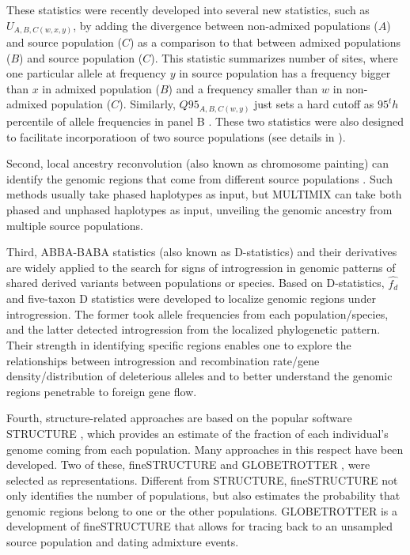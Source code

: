 \documentclass[11pt]{article}
\begin{document}
\begin{enumerate}
These statistics were recently developed into several new statistics, such as $U_{A,B,C(w,x,y)}$, by adding the divergence between non-admixed populations ($A$) and source population ($C$) as a comparison to that between admixed populations ($B$) and source population ($C$)\cite{racimo2016}. 
This statistic summarizes number of sites, where one particular allele at frequency $y$ in source population has a frequency bigger than $x$ in admixed population ($B$) and a frequency smaller than $w$ in non-admixed population ($C$).
Similarly, $Q95_{A,B,C(w,y)}$ just sets a hard cutoff as $95^th$ percentile of allele frequencies in panel B \cite{racimo2016}. 
These two statistics were also designed to facilitate incorporatioon of two source populations (see details in \cite{racimo2016}).
 
 
Second, local ancestry reconvolution (also known as chromosome painting) can identify the genomic regions that come from different source populations \cite{schraiber2015}. 
Such methods usually take phased haplotypes as input, but MULTIMIX \cite{churchhouse2013} can take both phased and unphased haplotypes as input, unveiling the genomic ancestry from multiple source populations.


Third, ABBA-BABA statistics (also known as D-statistics) and their derivatives are widely applied to the search for signs of introgression in genomic patterns of shared derived variants between populations or species. 
Based on D-statistics, $\hat{f_{d}}$ \cite{Martin2015} and five-taxon D statistics \cite{pease2015} were developed to localize genomic regions under introgression. 
The former took allele frequencies from each population/species, and the latter detected introgression from the localized phylogenetic pattern.
Their strength in identifying specific regions enables one to explore the relationships between introgression and recombination rate/gene density/distribution of deleterious alleles and to better understand the genomic regions penetrable to foreign gene flow. 

Fourth, structure-related approaches are based on the popular software STRUCTURE \cite{pritchard2000}, which provides an estimate of the fraction of each individual's genome coming from each population. 
Many approaches in this respect have been developed.
Two of these, fineSTRUCTURE \cite{Lawson2012} and GLOBETROTTER \cite{hellenthal2014}, were selected as representations.
Different from STRUCTURE, fineSTRUCTURE not only identifies the number of populations, but also estimates the probability that genomic regions belong to one or the other populations. 
GLOBETROTTER is a development of fineSTRUCTURE that allows for tracing back to an unsampled source population and dating admixture events.


\end{enumerate}
\end{document}
